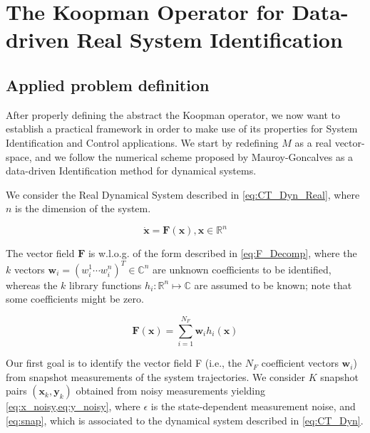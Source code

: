 \documentclass{article}
\begin{document}
\begin{comment}
    By taking advantage of this linearity, we can now make use of eigenfunction decomposition in order to obtain further information from the defined operator. We call $\phi : M \mapsto \mathbb{C}$ an eigenfunction of the Koopman operator $U$, associated to an eigenvalue $\lambda \in \mathbb{C}$.
\end{comment}

\section{The Koopman Operator for Data-driven Real System Identification}

    \subsection{Applied problem definition}

        After properly defining the abstract the Koopman operator, we now want to establish a practical framework in order to make use of its properties for System Identification and Control applications. We start by redefining $M$ as a real vector-space, and we follow the numerical scheme proposed by Mauroy-Goncalves\cite{Goncalves} as a data-driven Identification method for dynamical systems.
        
        We consider the Real Dynamical System described in \cref{eq:CT_Dyn_Real}, where $n$ is the dimension of the system. 

        \begin{equation} \label{eq:CT_Dyn_Real}
            \dot{\mathbf{x}} = \mathbf{F}\left(\mathbf{x}\right), \mathbf{x} \in \mathbb{R}^n
        \end{equation}

        The vector field $\mathbf{F}$ is w.l.o.g. of the form described in \cref{eq:F_Decomp}, where the $k$ vectors $\mathbf{w}_i = \left( w_i^1 \cdots w_i^n \right)^T \in \mathbb{C}^n$ are unknown coefficients to be identified, whereas the $k$ library functions $h_i : \mathbb{R}^n \mapsto \mathbb{C}$ are assumed to be known; note that some coefficients might be zero.

        \begin{equation} \label{eq:F_Decomp}
            \mathbf{F}(\mathbf{x}) = \sum_{i = 1}^{N_F} \mathbf{w}_i h_i \left( \mathbf{x} \right)
        \end{equation}

        Our first goal is to identify the vector field F (i.e., the $N_F$ coefficient vectors $\mathbf{w}_i$) from snapshot measurements of the system trajectories. We consider $K$ snapshot pairs $\left(\mathbf{x}_k,\mathbf{y}_k\right)$ obtained from noisy measurements yielding \cref{eq:x_noisy,eq:y_noisy}, where $\epsilon$ is the state-dependent measurement noise, and \cref{eq:snap}, which is associated to the dynamical system described in \cref{eq:CT_Dyn}.
\end{document}
